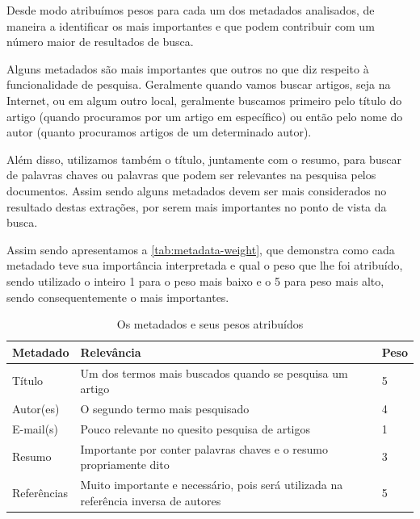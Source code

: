 Desde modo atribuímos pesos para cada um dos metadados analisados, de maneira a identificar os mais importantes e que podem contribuir com um número maior de resultados de busca. 


Alguns metadados são mais importantes que outros no que diz respeito à funcionalidade de pesquisa. Geralmente quando vamos buscar artigos, seja na Internet, ou em algum outro local, geralmente buscamos primeiro pelo título do artigo (quando procuramos por um artigo em específico) ou então pelo nome do autor (quanto procuramos artigos de um determinado autor).

Além disso, utilizamos também o título, juntamente com o resumo, para buscar de palavras chaves ou palavras que podem ser relevantes na pesquisa pelos documentos. Assim sendo alguns metadados devem ser mais considerados no resultado destas extrações, por serem mais importantes no ponto de vista da busca.

Assim sendo apresentamos a \autoref{tab:metadata-weight}, que demonstra como cada metadado teve sua importância interpretada e qual o peso que lhe foi atribuído, sendo utilizado o inteiro 1 para o peso mais baixo e o 5 para peso mais alto, sendo consequentemente o mais importantes.


\begin{table}
    \caption{Os metadados e seus pesos atribuídos}
    \begin{center}
    	\begin{tabular}{|p{3cm}|p{8cm}|C{1cm}|}
			\hline \textbf{Metadado} & \textbf{Relevância} & \textbf{Peso} \\ 
			\hline Título & Um dos termos mais buscados quando se pesquisa um artigo & 5 \\
	    	\hline Autor(es) & O segundo termo mais pesquisado & 4 \\
	    	\hline E-mail(s) & Pouco relevante no quesito pesquisa de artigos & 1 \\
	    	\hline Resumo & Importante por conter palavras chaves e o resumo propriamente dito & 3 \\
	    	\hline Referências & Muito importante e necessário, pois será utilizada na referência inversa de autores & 5 \\
	    	\hline 
    	\end{tabular} 
    \end{center}
  	\label{tab:metadata-weight}
\end{table}

